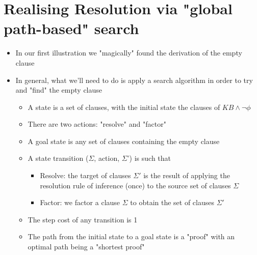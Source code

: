 \documentclass{article}[18pt]
\begin{document}
\section{Realising Resolution via "global path-based" search}
\begin{itemize}
	\item In our first illustration we "magically" found the derivation of the empty clause
	\item In general, what we'll need to do is apply a search algorithm in order to try and "find" the empty clause
	\begin{itemize}
		\item A state is a set of clauses, with the initial state the clauses of $KB\land \lnot \phi$
		\item There are two actions: "resolve" and "factor"
		\item A goal state is any set of clauses containing the empty clause
		\item A state transition ($\Sigma$, action, $\Sigma$') is such that
		\begin{itemize}
			\item Resolve: the target of clauses $\Sigma'$ is the result of applying the resolution rule of inference (once) to the source set of clauses $\Sigma$
			\item Factor: we factor a clause $\Sigma$ to obtain the set of clauses $\Sigma'$
		\end{itemize}
		\item The step cost of any transition is 1
		\item The path from the initial state to a goal state is a "proof" with an optimal path being a "shortest proof" 
	\end{itemize}
\end{itemize}
\end{document}
